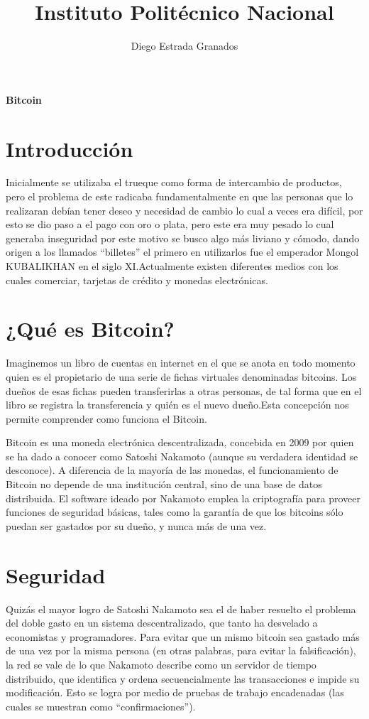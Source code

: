 \documentclass[12pt,letterpaper]{article}
\author{Diego Estrada Granados}
\title{Instituto Politécnico Nacional}
\begin{document}
\maketitle
\begin{center}
\textbf{Bitcoin}
\end{center}

\section*{Introducción}
Inicialmente se utilizaba el trueque como forma de intercambio de productos, pero el problema de este radicaba fundamentalmente en que las personas que lo realizaran debían tener deseo y necesidad de cambio lo cual a veces era difícil, por esto se dio paso a el pago con oro o plata, pero este era muy pesado lo cual generaba inseguridad por este motivo se busco algo más liviano y cómodo, dando origen a los llamados “billetes” el primero en utilizarlos fue el emperador Mongol KUBALIKHAN en el siglo XI.Actualmente existen diferentes medios con los cuales comerciar, tarjetas de crédito y monedas electrónicas. 

\section*{¿Qué es Bitcoin?}
Imaginemos un libro de cuentas en internet en el que se anota en todo momento quien es el propietario de una serie de fichas virtuales denominadas bitcoins. 
Los dueños de esas fichas pueden transferirlas a otras personas, de tal forma que en el libro se registra la transferencia y quién es el nuevo dueño.Esta concepción nos permite comprender como funciona el Bitcoin.

Bitcoin es una moneda electrónica descentralizada, concebida en 2009 por quien se ha dado a conocer como Satoshi Nakamoto (aunque su verdadera identidad se desconoce). A diferencia  de la mayoría de las monedas, el funcionamiento de Bitcoin no depende de una institución central, sino de una base de datos distribuida. El software ideado por Nakamoto emplea la criptografía para proveer funciones de seguridad básicas, tales como la garantía de que los bitcoins sólo puedan ser gastados por su dueño, y nunca más de una vez.

\section*{Seguridad}
Quizás el mayor logro de Satoshi Nakamoto sea el de haber resuelto el problema del doble gasto en un sistema descentralizado, que tanto ha desvelado a economistas y programadores. Para evitar que un mismo bitcoin sea gastado más de una vez por la misma persona (en otras palabras, para evitar la falsificación), la red se vale de lo que Nakamoto describe como un servidor de tiempo distribuido, que identifica y ordena secuencialmente las transacciones e impide su modificación. Esto se logra por medio de pruebas de trabajo encadenadas (las cuales se muestran como “confirmaciones”). 
\end{document}
